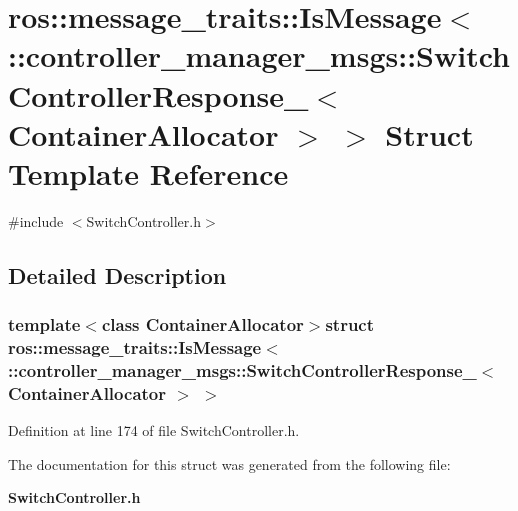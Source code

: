\section{ros\-:\-:message\-\_\-traits\-:\-:\-Is\-Message$<$ \-:\-:controller\-\_\-manager\-\_\-msgs\-:\-:\-Switch\-Controller\-Response\-\_\-$<$ \-Container\-Allocator $>$ $>$ \-Struct \-Template \-Reference}
\label{structros_1_1message__traits_1_1IsMessage_3_01_1_1controller__manager__msgs_1_1SwitchControllerRc0eef3f25e827d0fe10dd5c8dd371a87}


{\ttfamily \#include $<$\-Switch\-Controller.\-h$>$}



\subsection{\-Detailed \-Description}
\subsubsection*{template$<$class Container\-Allocator$>$struct ros\-::message\-\_\-traits\-::\-Is\-Message$<$ \-::controller\-\_\-manager\-\_\-msgs\-::\-Switch\-Controller\-Response\-\_\-$<$ Container\-Allocator $>$ $>$}



\-Definition at line 174 of file \-Switch\-Controller.\-h.



\-The documentation for this struct was generated from the following file\-:\begin{DoxyCompactItemize}
\item 
{\bf \-Switch\-Controller.\-h}\end{DoxyCompactItemize}
